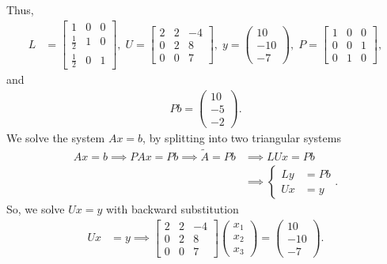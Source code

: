 \documentclass{report}
\begin{document}
    Thus,
    \begin{align*}
        L &= \begin{bmatrix}
            1 & 0 & 0 \\
            \frac{1}{2} & 1 & 0 \\
            \frac{1}{2} & 0  & 1
        \end{bmatrix},\;
        U = 
        \begin{bmatrix}
            2 & 2 & -4 \\
            0 & 2 & 8 \\
            0 & 0 & 7
        \end{bmatrix},\;
            y = \begin{pmatrix} 10 \\ -10 \\ -7 \end{pmatrix},\;
            P = \begin{bmatrix}
                1 & 0 & 0 \\
                0 & 0 & 1 \\
                0 & 1 & 0
            \end{bmatrix}, 
    \end{align*}
    and
    \begin{align*}
        Pb = \begin{pmatrix} 10 \\ -5 \\ -2 \end{pmatrix}
    .\end{align*}
    We solve the system $Ax = b$, by splitting into two triangular systems
    \begin{align*}
        Ax = b \implies PAx = Pb \implies \tilde{A} = Pb &\implies LUx = Pb \\
                                                         &\implies 
        \begin{cases}
            Ly &= Pb \\
            Ux &= y 
        \end{cases}
    .\end{align*}
    So, we solve $Ux = y$ with backward substitution
    \begin{align*}
        Ux &= y \implies 
        \begin{bmatrix}
            2 & 2 & -4 \\
            0 & 2 & 8 \\
            0 & 0 & 7
        \end{bmatrix}
        \begin{pmatrix} x_{1} \\ x_{2} \\ x_{3} \end{pmatrix}
        = \begin{pmatrix} 10 \\ -10 \\ -7 \end{pmatrix}
    .\end{align*}
\end{document}
